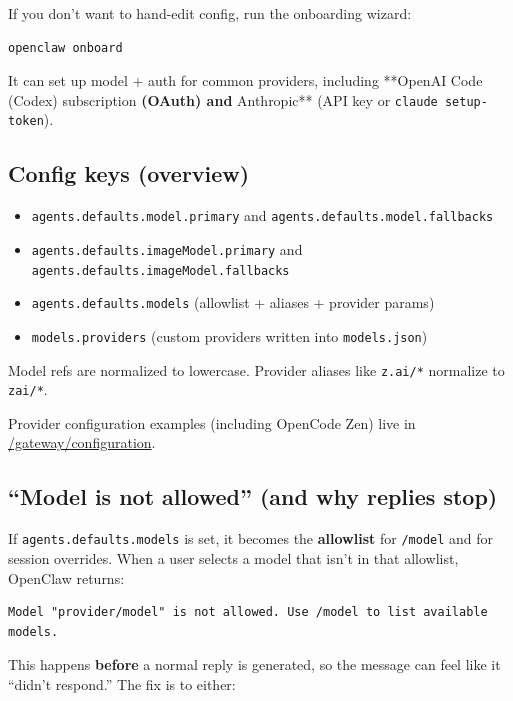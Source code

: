 If you don’t want to hand-edit config, run the onboarding wizard:

\begin{lstlisting}[language=bash]
openclaw onboard
\end{lstlisting}


It can set up model + auth for common providers, including **OpenAI Code (Codex)
subscription\textbf{ (OAuth) and }Anthropic** (API key or \texttt{claude setup-token}).

\subsection{Config keys (overview)}


\begin{itemize}
  \item \texttt{agents.defaults.model.primary} and \texttt{agents.defaults.model.fallbacks}
  \item \texttt{agents.defaults.imageModel.primary} and \texttt{agents.defaults.imageModel.fallbacks}
  \item \texttt{agents.defaults.models} (allowlist + aliases + provider params)
  \item \texttt{models.providers} (custom providers written into \texttt{models.json})
\end{itemize}


Model refs are normalized to lowercase. Provider aliases like \texttt{z.ai/*} normalize
to \texttt{zai/*}.

Provider configuration examples (including OpenCode Zen) live in
\href{/gateway/configuration\#opencode-zen-multi-model-proxy}{/gateway/configuration}.

\subsection{“Model is not allowed” (and why replies stop)}


If \texttt{agents.defaults.models} is set, it becomes the \textbf{allowlist} for \texttt{/model} and for
session overrides. When a user selects a model that isn’t in that allowlist,
OpenClaw returns:

\begin{lstlisting}
Model "provider/model" is not allowed. Use /model to list available models.
\end{lstlisting}


This happens \textbf{before} a normal reply is generated, so the message can feel
like it “didn’t respond.” The fix is to either:

